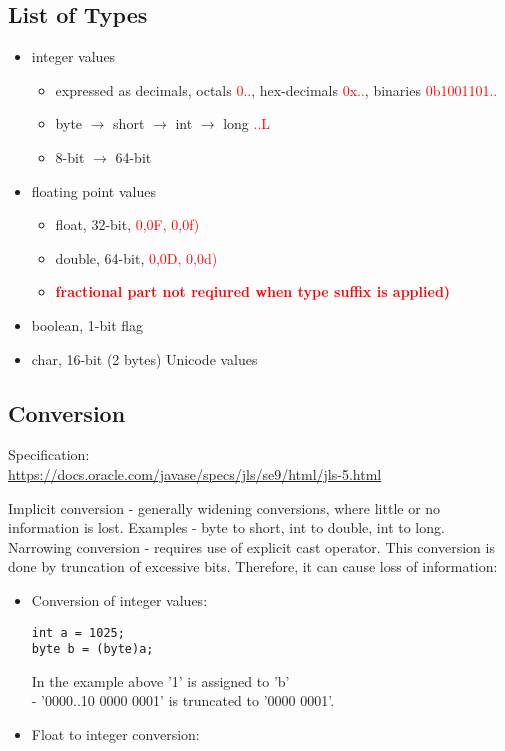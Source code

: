\documentclass{report}
\begin{document}
\subsection{List of Types}
\begin{itemize}
\item integer values
\begin{itemize}
\item expressed as decimals, octals \textcolor{red}{0..}, hex-decimals \textcolor{red}{0x..}, binaries \textcolor{red}{0b1001101..}
\item byte $\rightarrow$ short $\rightarrow$ int $\rightarrow$ long \textcolor{red}{..L}
\item 8-bit $\rightarrow$ 64-bit
\end{itemize}

\item floating point values
\begin{itemize}
\item float, 32-bit, \textcolor{red}{0,0F, 0,0f)}
\item double, 64-bit, \textcolor{red}{0,0D, 0,0d)}
\item \textbf{\textcolor{red}{fractional part not reqiured when type suffix is applied)}}
\end{itemize}

\item boolean, 1-bit flag

\item char, 16-bit (2 bytes) Unicode values
\end{itemize}

\subsection{Conversion}
Specification:\\
\url{https://docs.oracle.com/javase/specs/jls/se9/html/jls-5.html}\\
\par
Implicit conversion - generally widening conversions, where little or no information is lost. Examples - byte to short, int to double, int to long.\\
Narrowing conversion - requires use of explicit cast operator. This conversion is done by truncation of excessive bits. Therefore, it can cause loss  of information:
\begin{itemize}
\item Conversion of integer values:
\begin{verbatim}
int a = 1025;
byte b = (byte)a;
\end{verbatim}
In the example above '1' is assigned to 'b'\\
- '0000..10 0000 0001' is truncated to '0000 0001'.
\item Float to integer conversion:
\end{itemize}
\end{document}
